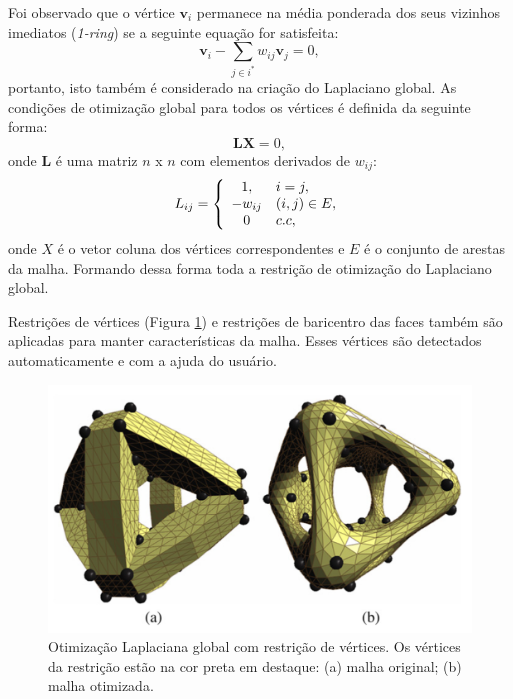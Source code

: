 Foi observado que o vértice $\mathbf{v}_i$ permanece na média ponderada dos seus vizinhos imediatos (\textit{1-ring}) se a seguinte equação for satisfeita:
\begin{equation}
    \mathbf{v}_i - \sum_{j\in i^*}{w_{ij}\mathbf{v}_j} = 0,
\end{equation}
portanto, isto também é considerado na criação do Laplaciano global. As condições de otimização global para todos os vértices é definida da seguinte forma:
\begin{equation}
    \mathbf{L}\mathbf{X} = 0,
\end{equation}
onde $\mathbf{L}$ é uma matriz $n$ x $n$ com elementos derivados de $w_{ij}$:
\begin{equation}
L_{ij}=\left\{
\begin{array}{c l}	
     1, & i=j,\\
     -w_{ij} & (i,j) \in E, \\
     0 & c.c,
\end{array}\right.
\end{equation}
onde $X$ é o vetor coluna dos vértices correspondentes e $E$ é o conjunto de arestas da malha. Formando dessa forma toda a restrição de otimização do Laplaciano global.

Restrições de vértices (Figura \ref{fig:restricao_vertices}) e restrições de baricentro das faces também são aplicadas para manter características da malha. Esses vértices são detectados automaticamente e com a ajuda do usuário.

\begin{figure}[!h]
\captionsetup{width=\linewidth}
\centering
\includegraphics[scale=0.25]{figuras/restricao_vertices.png}
\caption{Otimização Laplaciana global com restrição de vértices. Os vértices da restrição estão na cor preta em destaque: (a) malha original; (b) malha otimizada.}
\label{fig:restricao_vertices}
\end{figure}

